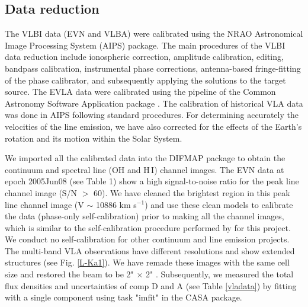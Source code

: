 \documentclass[]{aa} %
\newcommand{\kms}{km s$^{-1}$\xspace}
\newcommand{\HI}{{\rm H\,{\scriptsize I}}\xspace}
\begin{document}



\subsection{Data reduction}
The VLBI data (EVN and VLBA) were calibrated using the NRAO Astronomical Image Processing System (AIPS) package. The main procedures of the VLBI data reduction include ionospheric correction, amplitude calibration, editing, bandpass calibration, instrumental phase corrections, antenna-based fringe-fitting of the phase calibrator, and subsequently applying the solutions to the target source.
The EVLA data were calibrated using the pipeline of the Common Astronomy Software Application package \citep[CASA][]{2007ASPC..376..127M}. The calibration of historical VLA data was done in AIPS following standard procedures. For determining accurately the velocities of the line emission, we have also corrected for the effects of the Earth's rotation and its motion within the Solar System.

We imported all the calibrated data into the DIFMAP package \citep{1997ASPC..125...77S} to obtain the continuum and spectral line (OH and \HI) channel images. The EVN data at epoch 2005Jun08 (see Table 1) show a high signal-to-noise ratio for the peak line channel image (S/N $>$ 60). We have cleaned the brightest region in this peak line channel image (V $\sim$ 10886 \kms) and use these clean models to calibrate the data (phase-only self-calibration) prior to making all the channel images, which is similar to the self-calibration procedure performed by \cite{2010PhDT.......280C} for this project. We conduct no self-calibration for other continuum and line emission projects. The multi-band VLA observations have different resolutions and show extended structures (see Fig. \ref{L-Ka1}). We have remade these images with the same cell size and restored the beam to be 2" $\times$ 2" \citep[the beam size of the VLA-A L-band map, see][]{2015A&A...574A...4V}. Subsequently, we measured the total flux densities and uncertainties of comp D and A (see Table \ref{vladata}) by fitting with a single component using task "imfit" in the CASA package.

\end{document}
